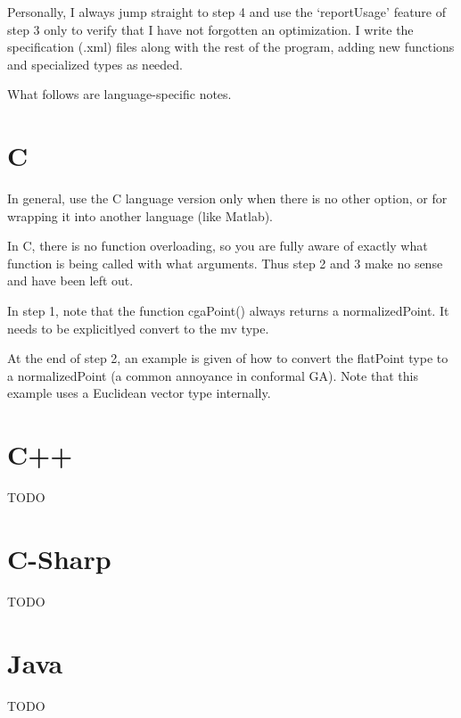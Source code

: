 \documentclass[10pt, a4paper]{article}
\begin{document}
Personally, I always jump straight to step 4 and use the `reportUsage' feature of step 3 only to 
verify that I have not forgotten an optimization. I write the specification (.xml) files along
with the rest of the program, adding new functions and specialized types as needed.

What follows are language-specific notes.

\section{C}

In general, use the C language version only when there is no other option,
or for wrapping it into another language (like Matlab).

In C, there is no function overloading, so you are fully aware of exactly what function 
is being called with what arguments. Thus step 2 and 3 make no sense and have been left out.

In step 1, note that the function cgaPoint() always returns a normalizedPoint. 
It needs to be explicitlyed convert to the mv type.

At the end of step 2, an example is given of how to convert the flatPoint type to a 
normalizedPoint (a common annoyance in conformal GA). Note that this example uses a 
Euclidean vector type internally.

\section{C++}
 TODO
 
\section{C-Sharp }

TODO

\section{Java}

TODO
\end{document}
